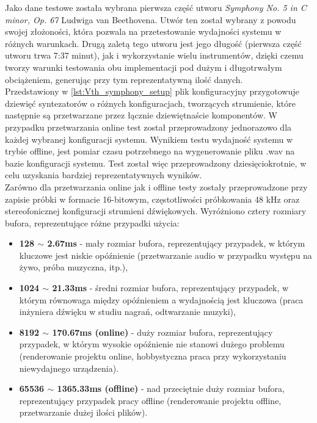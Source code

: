Jako dane testowe została wybrana pierwsza część utworu \textit{Symphony No. 5 in C minor, Op. 67} Ludwiga van Beethovena. Utwór ten został wybrany z powodu swojej złożoności, która pozwala na przetestowanie wydajności systemu w różnych warunkach. Drugą zaletą tego utworu jest jego długość (pierwsza część utworu trwa 7:37 minut), jak i wykorzystanie wielu instrumentów, dzięki czemu tworzy warunki testowania obu implementacji pod dużym i długotrwałym obciążeniem, generując przy tym reprezentatywną ilość danych.
\\
Przedstawiony w \autoref{lst:Vth_symphony_setup} plik konfiguracyjny przygotowuje dziewięć syntezatorów o różnych konfiguracjach, tworzących strumienie, które następnie są przetwarzane przez łącznie dziewiętnaście komponentów. W przypadku przetwarzania online test został przeprowadzony jednorazowo dla każdej wybranej konfiguracji systemu. Wynikiem testu wydajność systemu w trybie offline, jest pomiar czasu potrzebnego na wygenerowanie pliku .wav na bazie konfiguracji systemu. Test został więc przeprowadzony dziesięciokrotnie, w celu uzyskania bardziej reprezentatywnych wyników.
\\
Zarówno dla przetwarzania online jak i offline testy zostały przeprowadzone przy zapisie próbki w formacie 16-bitowym, częstotliwości próbkowania 48 kHz oraz stereofonicznej konfiguracji strumieni dźwiękowych. Wyróżniono cztery rozmiary bufora, reprezentujące różne przypadki użycia:
\begin{itemize}
    \item \textbf{128 $\sim$ 2.67ms} - mały rozmiar bufora, reprezentujący przypadek, w którym kluczowe jest niskie opóźnienie (przetwarzanie audio w przypadku występu na żywo, próba muzyczna, itp.),
    \item \textbf{1024 $\sim$ 21.33ms} - średni rozmiar bufora, reprezentujący przypadek, w którym równowaga między opóźnieniem a wydajnością jest kluczowa (praca inżyniera dźwięku w studiu nagrań, odtwarzanie muzyki),
    \item \textbf{8192 $\sim$ 170.67ms (online)} - duży rozmiar bufora, reprezentujący przypadek, w którym wysokie opóźnienie nie stanowi dużego problemu (renderowanie projektu online, hobbystyczna praca przy wykorzystaniu niewydajnego urządzenia).
    \item \textbf{65536 $\sim$ 1365.33ms (offline)} - nad przeciętnie duży rozmiar bufora, reprezentujący przypadek pracy offline (renderowanie projektu offline, przetwarzanie dużej ilości plików). 
\end{itemize}

